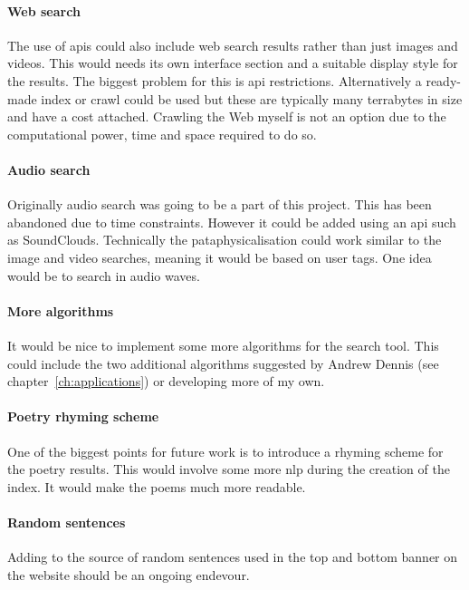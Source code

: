 \paragraph{Web search} 
The use of \gls{api}s could also include web search results rather than just images and videos. This would needs its own interface section and a suitable display style for the results. The biggest problem for this is \gls{api} restrictions. Alternatively a ready-made index or crawl could be used but these are typically many terrabytes in size and have a cost attached. Crawling the Web myself is not an option due to the computational power, time and space required to do so.

\paragraph{Audio search} 
Originally audio search was going to be a part of this project. This has been abandoned due to time constraints. However it could be added using an \gls{api} such as SoundClouds. Technically the pataphysicalisation could work similar to the image and video searches, meaning it would be based on user tags. One idea would be to search in audio waves.

\paragraph{More algorithms} 
It would be nice to implement some more algorithms for the search tool. This could include the two additional algorithms suggested by Andrew Dennis (see chapter~\ref{ch:applications}) or developing more of my own. 

\paragraph{Poetry rhyming scheme} 
One of the biggest points for future work is to introduce a rhyming scheme for the poetry results. This would involve some more \gls{nlp} during the creation of the index. It would make the poems much more readable.

\paragraph{Random sentences} 
Adding to the source of random sentences used in the top and bottom banner on the website should be an ongoing endevour.

